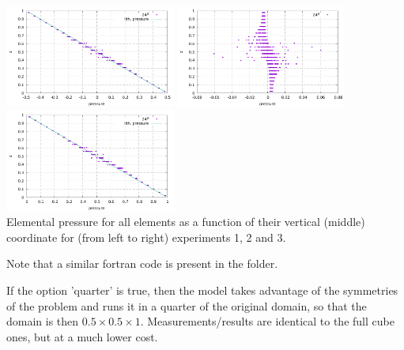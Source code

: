 \begin{center}
\includegraphics[width=5.6cm]{python_codes/fieldstone_10/results/exp1/pressure.pdf}
\includegraphics[width=5.6cm]{python_codes/fieldstone_10/results/exp2/pressure.pdf}
\includegraphics[width=5.6cm]{python_codes/fieldstone_10/results/exp3/pressure.pdf}\\
{\captionfont Elemental pressure for all elements as a function of their vertical 
(middle) coordinate for (from left to right) experiments 1, 2 and 3. }
\end{center}

Note that a similar fortran code is present in the folder. 

If the option 'quarter' is true, then the model takes advantage of the symmetries 
of the problem and runs it in a quarter of the original domain, so that 
the domain is then $0.5\times 0.5 \times 1$. Measurements/results are identical 
to the full cube ones, but at a much lower cost.

